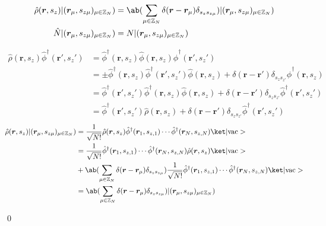\documentclass[uplatex,dvipdfmx,a4paper,11pt]{jlreq}
\makeatletter
\newcommand{\ZZ}{\mathbb{Z}}
\newcommand{\rr}{\bm{r}}
\numberwithin{equation}{section}
\theoremstyle{definition}
\renewenvironment{proof}[1][\proofname]{\par
  \normalfont
  \topsep6\p@\@plus6\p@ \trivlist
  \item[\hskip\labelsep{\bfseries #1}\@addpunct{\bfseries}]\ignorespaces\quad\par
}{
  \qed\endtrivlist\@endpefalse
}
\renewcommand\proofname{証明}
\makeatother
\begin{document}
\begin{theorem}[Q21-86(iv)(v)(vi)]
  \begin{align}
    \hat{\rho}(\rr, s_z)|(\rr_\mu, s_{z\mu})_{\mu\in\ZZ_N}) & = \ab(\sum_{\mu\in\ZZ_N}\delta(\rr - \rr_\mu)\delta_{s_zs_{z\mu}})|(\rr_\mu, s_{z\mu})_{\mu\in\ZZ_N}) \\
    \hat{N}|(\rr_\mu, s_{z\mu})_{\mu\in\ZZ_N})              & = N|(\rr_\mu, s_{z\mu})_{\mu\in\ZZ_N})
  \end{align}
\end{theorem}
\begin{proof}
  \begin{align}
    \hat{\rho}(\rr, s_z)\hat{\phi}^\dagger(\rr', s_z') & = \hat{\phi}^\dagger(\rr, s_z)\hat{\phi}(\rr, s_z)\hat{\phi}^\dagger(\rr', s_z')                                                                       \\
                                                       & = \pm\hat{\phi}^\dagger(\rr, s_z)\hat{\phi}^\dagger(\rr', s_z')\hat{\phi}(\rr, s_z) + \delta(\rr - \rr')\delta_{s_zs_{z'}}\hat{\phi}^\dagger(\rr, s_z) \\
                                                       & = \hat{\phi}^\dagger(\rr', s_z')\hat{\phi}^\dagger(\rr, s_z)\hat{\phi}(\rr, s_z) + \delta(\rr - \rr')\delta_{s_zs_{z'}}\hat{\phi}^\dagger(\rr', s_z')  \\
                                                       & = \hat{\phi}^\dagger(\rr', s_z')\hat{\rho}(\rr, s_z) + \delta(\rr - \rr')\delta_{s_zs_{z'}}\hat{\phi}^\dagger(\rr', s_z')
  \end{align}
  \begin{align}
    \hat{\rho}(\rr, s_z)|(\rr_\mu, s_{z\mu})_{\mu\in\ZZ_N}) & = \frac{1}{\sqrt{N!}}\hat{\rho}(\rr, s_z)\hat{\phi}^\dagger(\rr_1, s_{z,1})\cdots\hat{\phi}^\dagger(\rr_N, s_{z,N})\ket|\mathrm{vac}>                                             \\
                                                            & = \frac{1}{\sqrt{N!}}\hat{\phi}^\dagger(\rr_1, s_{z,1})\cdots\hat{\phi}^\dagger(\rr_N, s_{z,N})\hat{\rho}(\rr, s_z)\ket|\mathrm{vac}>                                             \\
                                                            & + \ab(\sum_{\mu\in\ZZ_N}\delta(\rr - \rr_\mu)\delta_{s_zs_{z\mu}})\frac{1}{\sqrt{N!}}\hat{\phi}^\dagger(\rr_1, s_{z,1})\cdots\hat{\phi}^\dagger(\rr_N, s_{z,N})\ket|\mathrm{vac}> \\
                                                            & = \ab(\sum_{\mu\in\ZZ_N}\delta(\rr - \rr_\mu)\delta_{s_zs_{z\mu}})|(\rr_\mu, s_{z\mu})_{\mu\in\ZZ_N})

\end{align}
\end{proof}
\end{document}

